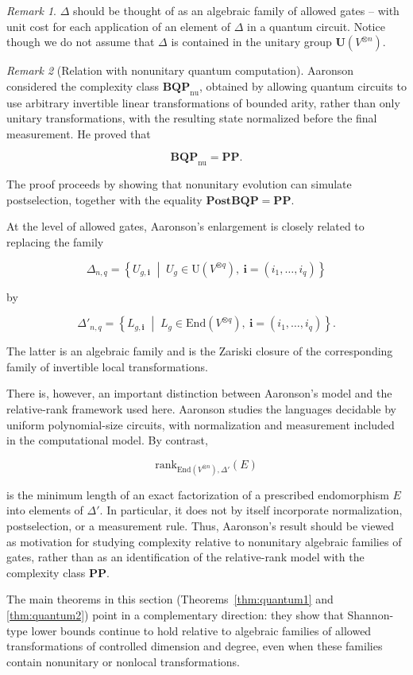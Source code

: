 \documentclass[10pt]{amsart}
\theoremstyle{definition}
\theoremstyle{remark}
\newtheorem{remark}{Remark}
\numberwithin{equation}{section}
\newcommand{\rank}{\mathrm{rank}}
\newcommand{\End}{\mathrm{End}}
\begin{document}
\begin{remark}
    \label{rem:oracle} 
    $\Delta$ should be thought of  
    as an algebraic family of allowed gates
    -- with unit cost for each application of an element of $\Delta$ in a quantum circuit. Notice though we do not assume that $\Delta$ is contained in the unitary group
    $\mathbf{U}(V^{\otimes n})$.
\end{remark}

\begin{remark}[Relation with nonunitary quantum computation]
Aaronson~\cite{Aaronson} considered the complexity class
\(\mathbf{BQP}_{\mathrm{nu}}\), obtained by allowing quantum circuits to use
arbitrary invertible linear transformations of bounded arity, rather than
only unitary transformations, with the resulting state normalized before
the final measurement. He proved that

$$
\mathbf{BQP}_{\mathrm{nu}}=\mathbf{PP}.
$$

The proof proceeds by showing that nonunitary evolution can simulate
postselection, together with the equality
\(\mathbf{PostBQP}=\mathbf{PP}\).

At the level of allowed gates, Aaronson's enlargement is closely related
to replacing the family

$$
\Delta_{n,q}
=
\left\{
U_{g,\mathbf i}
\;\middle|\;
U_g\in \mathrm U(V^{\otimes q}),\ 
\mathbf i=(i_1,\ldots,i_q)
\right\}
$$

by

$$
\Delta'_{n,q}
=
\left\{
L_{g,\mathbf i}
\;\middle|\;
L_g\in\End(V^{\otimes q}),\ 
\mathbf i=(i_1,\ldots,i_q)
\right\}.
$$

The latter is an algebraic family and is the Zariski closure of the
corresponding family of invertible local transformations.

There is, however, an important distinction between Aaronson's model and
the relative-rank framework used here.  Aaronson studies the languages
decidable by uniform polynomial-size circuits, with normalization and
measurement included in the computational model.  By contrast,

$$
\rank_{\End(V^{\otimes n}),\Delta'}(E)
$$

is the minimum length of an exact factorization of a prescribed
endomorphism \(E\) into elements of \(\Delta'\).  In particular, it does
not by itself incorporate normalization, postselection, or a measurement
rule.  Thus, Aaronson's result should be viewed as motivation for studying
complexity relative to nonunitary algebraic families of gates, rather
than as an identification of the relative-rank model with the complexity
class \(\mathbf{PP}\).


The main theorems in this section (Theorems~\ref{thm:quantum1} and \ref{thm:quantum2}) point in a complementary direction: they show that
Shannon-type lower bounds continue to hold relative to algebraic families
of allowed transformations of controlled dimension and degree, even when
these families contain nonunitary or nonlocal transformations.
\end{remark}
\end{document}
